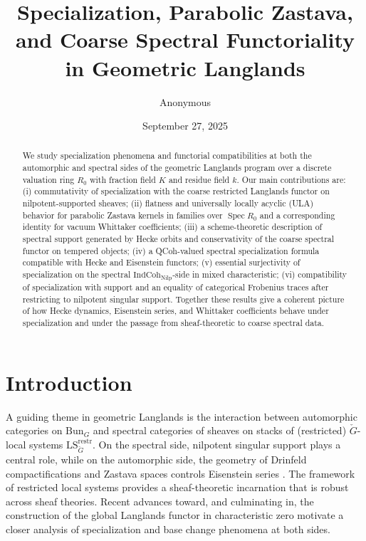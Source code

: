 \documentclass[11pt]{article}
\title{Specialization, Parabolic Zastava, and Coarse Spectral Functoriality in Geometric Langlands}
\author{\small Anonymous}
\date{\small September 27, 2025}
\newcommand{\IndCoh}{\mathrm{IndCoh}}
\newcommand{\Nilp}{\mathrm{Nilp}}
\newcommand{\LS}{\mathrm{LS}}
\newcommand{\Bun}{\mathrm{Bun}}
\newcommand{\restr}{\mathrm{restr}}
\theoremstyle{plain}
\theoremstyle{definition}
\theoremstyle{remark}
\begin{document}
\maketitle

\begin{abstract}
We study specialization phenomena and functorial compatibilities at both the automorphic and spectral sides of the geometric Langlands program over a discrete valuation ring $R_0$ with fraction field $K$ and residue field $k$. Our main contributions are: (i) commutativity of specialization with the coarse restricted Langlands functor on nilpotent-supported sheaves; (ii) flatness and universally locally acyclic (ULA) behavior for parabolic Zastava kernels in families over $\operatorname{Spec} R_0$ and a corresponding identity for vacuum Whittaker coefficients; (iii) a scheme-theoretic description of spectral support generated by Hecke orbits and conservativity of the coarse spectral functor on tempered objects; (iv) a QCoh-valued spectral specialization formula compatible with Hecke and Eisenstein functors; (v) essential surjectivity of specialization on the spectral $\IndCoh_{\Nilp}$-side in mixed characteristic; (vi) compatibility of specialization with support and an equality of categorical Frobenius traces after restricting to nilpotent singular support. Together these results give a coherent picture of how Hecke dynamics, Eisenstein series, and Whittaker coefficients behave under specialization and under the passage from sheaf-theoretic to coarse spectral data.
\end{abstract}

\tableofcontents

\section{Introduction}
A guiding theme in geometric Langlands is the interaction between automorphic categories on $\Bun_G$ and spectral categories of sheaves on stacks of (restricted) $\check G$-local systems $\LS^{\restr}_{\check G}$. On the spectral side, nilpotent singular support \cite{ArinkinGaitsgory2015-SingularSupport} plays a central role, while on the automorphic side, the geometry of Drinfeld compactifications and Zastava spaces controls Eisenstein series \cite{BravermanGaitsgory2002-GeometricEisenstein,BFGM2002-ICDrinfeld}. The framework of restricted local systems \cite{AGKRRV2020-RestrictedLocSys} provides a sheaf-theoretic incarnation that is robust across sheaf theories. Recent advances toward, and culminating in, the construction of the global Langlands functor in characteristic zero \cite{GaitsgoryRaskin2024-GLFunctorI} motivate a closer analysis of specialization and base change phenomena at both sides.
\end{document}
